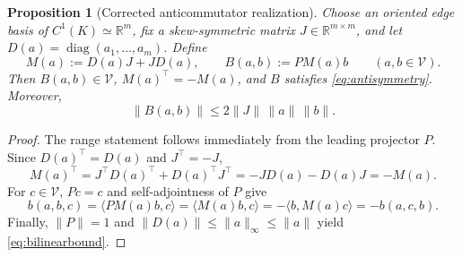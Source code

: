 \documentclass[10pt,a4paper]{amsart}
\newtheorem{proposition}{Proposition}
\begin{document}
\begin{proposition}[Corrected anticommutator realization]\label{prop:toy}
Choose an oriented edge basis of $C^1(K)\simeq\mathbb R^m$, fix a skew-symmetric matrix $J\in\mathbb R^{m\times m}$, and let $D(a)=\operatorname{diag}(a_1,\ldots,a_m)$. Define
\begin{equation}
M(a):=D(a)J+JD(a),
\qquad
B(a,b):=PM(a)b
\qquad(a,b\in\mathcal V).
\label{eq:anticommutator}
\end{equation}
Then $B(a,b)\in\mathcal V$, $M(a)^\top=-M(a)$, and $B$ satisfies \eqref{eq:antisymmetry}. Moreover,
\begin{equation}
\|B(a,b)\|\leq2\|J\|\,\|a\|\,\|b\|.
\label{eq:bilinearbound}
\end{equation}
\end{proposition}

\begin{proof}
The range statement follows immediately from the leading projector $P$. Since $D(a)^\top=D(a)$ and $J^\top=-J$,
\[
M(a)^\top=J^\top D(a)^\top+D(a)^\top J^\top=-JD(a)-D(a)J=-M(a).
\]
For $c\in\mathcal V$, $Pc=c$ and self-adjointness of $P$ give
\[
b(a,b,c)=\langle PM(a)b,c\rangle
=\langle M(a)b,c\rangle
=-\langle b,M(a)c\rangle
=-b(a,c,b).
\]
Finally, $\|P\|=1$ and $\|D(a)\|\leq\|a\|_\infty\leq\|a\|$ yield \eqref{eq:bilinearbound}.
\end{proof}
\end{document}
